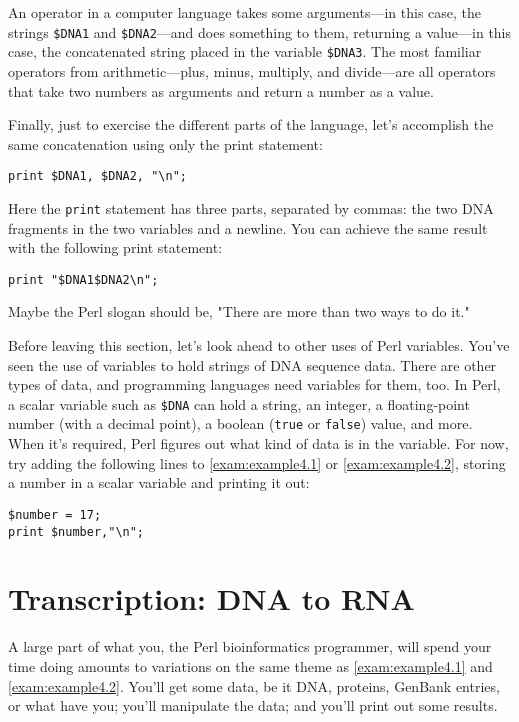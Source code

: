 \begin{adjustwidth}{2cm}{2cm}
  An operator in a computer language takes some arguments—in this case, the strings \verb|$DNA1| and \verb|$DNA2|—and does something to them, returning a value—in this case, the concatenated string placed in the variable \verb|$DNA3|. The most familiar operators from arithmetic—plus, minus, multiply, and divide—are all operators that take two numbers as arguments and return a number as a value. 
\end{adjustwidth}

Finally, just to exercise the different parts of the language, let's accomplish the same concatenation using only the print statement:

\begin{lstlisting}
print $DNA1, $DNA2, "\n";
\end{lstlisting}

Here the \verb|print| statement has three parts, separated by commas: the two DNA fragments in the two variables and a newline. You can achieve the same result with the following print statement:

\begin{lstlisting}
print "$DNA1$DNA2\n";
\end{lstlisting}

Maybe the Perl slogan should be, "There are more than two ways to do it."

Before leaving this section, let's look ahead to other uses of Perl
variables. You've seen the use of variables to hold strings of DNA
sequence data. There are other types of data, and programming languages
need variables for them, too. In Perl, a scalar variable such as
\verb|$DNA| can hold a string, an integer, a floating-point number (with
a decimal point), a boolean (\verb|true| or \verb|false|) value, and
more. When it's required, Perl figures out what kind of data is in the
variable. For now, try adding the following lines to
\autoref{exam:example4.1} or \autoref{exam:example4.2}, storing a number in a scalar variable and printing it out:

\begin{lstlisting}
$number = 17;
print $number,"\n";
\end{lstlisting}

\section{Transcription: DNA to RNA}
A large part of what you, the Perl bioinformatics programmer, will spend your time doing amounts to variations on the same theme as \autoref{exam:example4.1} and \autoref{exam:example4.2}. You'll get some data, be it DNA, proteins, GenBank entries, or what have you; you'll manipulate the data; and you'll print out some results.

